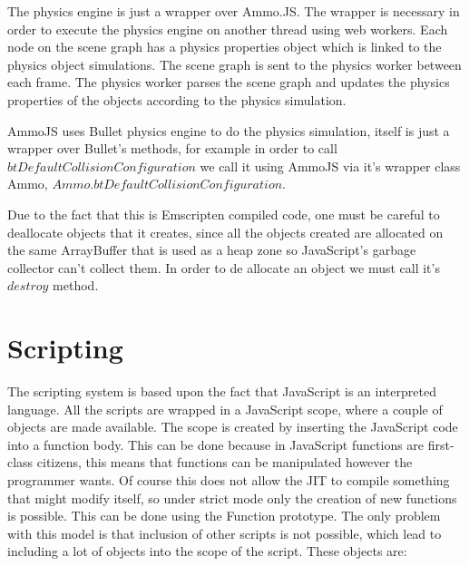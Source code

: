 The physics engine is just a wrapper over Ammo.JS. The wrapper is necessary in order to execute the physics engine on another thread using web workers.
Each node on the scene graph has a physics properties object which is linked to the physics object simulations. The scene graph is sent to the physics worker between each frame. The physics worker parses the scene graph and updates the physics properties of the objects according to the physics simulation.

AmmoJS uses Bullet physics engine to do the physics simulation, itself is just a wrapper over Bullet's methods, for example in order to call $btDefaultCollisionConfiguration$ we call it using AmmoJS via it's wrapper class Ammo, $Ammo.btDefaultCollisionConfiguration$.

Due to the fact that this is Emscripten compiled code, one must be careful to deallocate objects that it creates, since all the objects created are allocated on the same ArrayBuffer that is used as a heap zone so JavaScript's garbage collector can't collect them. In order to de allocate an object we must call it's $destroy$ method.
\section{Scripting}

The scripting system is based upon the fact that JavaScript is an interpreted language. All the scripts are wrapped in a JavaScript scope, where a couple of objects are made available. The scope is created by inserting the JavaScript code into a function body. This can be done because in JavaScript functions are first-class citizens, this means that functions can be manipulated however the programmer wants. Of course this does not allow the JIT to compile something that might modify itself, so under strict mode only the creation of new functions is possible. This can be done using the Function prototype.
The only problem with this model is that inclusion of other scripts is not possible, which lead to including a lot of objects into the scope of the script.
These objects are:


